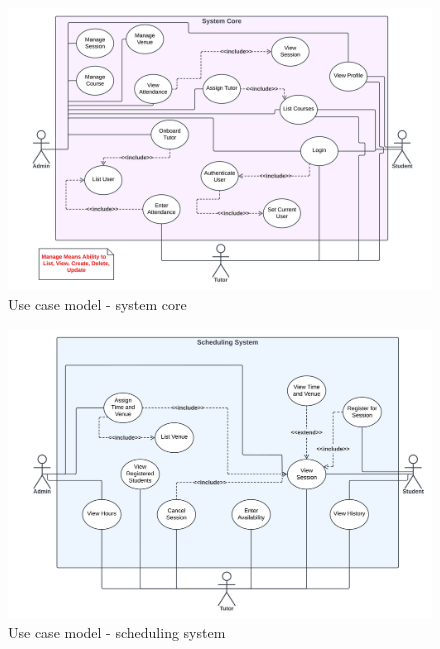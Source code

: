 \begin{justify}
\begin{figure}[H]
    \centerline{\includegraphics[width=150mm,scale=1]{figures/analysis_and_design/analysis/2. System Core.png}}
    \caption{Use case model - system core}
    \label{SystemCore}
\end{figure}

\begin{figure}[H]
    \centerline{\includegraphics[width=150mm,scale=1]{figures/analysis_and_design/analysis/3. Scheduling System.png}}
    \caption{Use case model - scheduling system}
    \label{SchedulingSystem}
\end{figure}


\end{justify}
